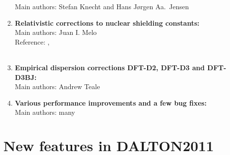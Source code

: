 \begin{enumerate}
Main authors: Stefan Knecht and Hans J{\o}rgen Aa.\ Jensen \\
\item{\bf  Relativistic corrections to nuclear shielding constants:}  \\
Main authors: Juan I. Melo \\
 Reference:  
   \cite{melojcp03} , \\
   \cite{melomaldojcp12} \\
\item{\bf  Empirical dispersion corrections DFT-D2, DFT-D3 and DFT-D3BJ:}  \\
Main authors: Andrew Teale \\
\item{\bf  Various performance improvements and a few bug fixes:}  \\
Main authors: many
\end{enumerate}

\section{New features in DALTON2011}

